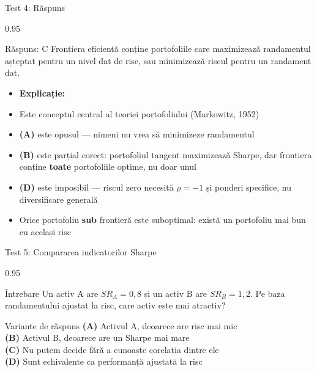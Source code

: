 \documentclass[9pt, aspectratio=169, t]{beamer}
\begin{document}
\begin{frame}[shrink=10]{Test 4: Răspuns}
\begin{cminipage}{0.95\textwidth}
    \begin{exampleblock}{Răspuns: C}
        Frontiera eficientă conține portofoliile care maximizează randamentul așteptat pentru un nivel dat de risc, sau minimizează riscul pentru un randament dat.
    \end{exampleblock}
    \vspace{0.2cm}
    \begin{itemize}\setlength{\itemsep}{0pt}
        \item \textbf{Explicație:}
        \item Este conceptul central al teoriei portofoliului (Markowitz, 1952)
        \item \textbf{(A)} este opusul --- nimeni nu vrea să minimizeze randamentul
        \item \textbf{(B)} este parțial corect: portofoliul tangent maximizează Sharpe, dar frontiera conține \textbf{toate} portofoliile optime, nu doar unul
        \item \textbf{(D)} este imposibil --- riscul zero necesită $\rho = -1$ și ponderi specifice, nu diversificare generală
        \item Orice portofoliu \textbf{sub} frontieră este suboptimal: există un portofoliu mai bun cu același risc
    \end{itemize}
\end{cminipage}
\end{frame}

\begin{frame}[shrink=10]{Test 5: Compararea indicatorilor Sharpe}
\begin{cminipage}{0.95\textwidth}
    \begin{alertblock}{Întrebare}
        Un activ A are $SR_A = 0{,}8$ și un activ B are $SR_B = 1{,}2$.
        Pe baza randamentului ajustat la risc, care activ este mai atractiv?
    \end{alertblock}

    \vspace{0.5cm}
    \begin{block}{Variante de răspuns}
    \textcolor{MainBlue}{\textbf{(A)}} Activul A, deoarece are risc mai mic\\[3pt]
    \textcolor{MainBlue}{\textbf{(B)}} Activul B, deoarece are un Sharpe mai mare\\[3pt]
    \textcolor{MainBlue}{\textbf{(C)}} Nu putem decide fără a cunoaște corelația dintre ele\\[3pt]
    \textcolor{MainBlue}{\textbf{(D)}} Sunt echivalente ca performanță ajustată la risc
    \end{block}
\end{cminipage}
\end{frame}
\end{document}
